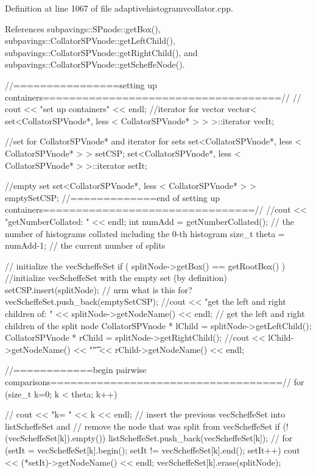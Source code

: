 \-Definition at line 1067 of file adaptivehistogramvcollator.\-cpp.



\-References subpavings\-::\-S\-Pnode\-::get\-Box(), subpavings\-::\-Collator\-S\-P\-Vnode\-::get\-Left\-Child(), subpavings\-::\-Collator\-S\-P\-Vnode\-::get\-Right\-Child(), and subpavings\-::\-Collator\-S\-P\-Vnode\-::get\-Scheffe\-Node().


\begin{DoxyCode}
{
  //================setting up containers====================================//
  // cout << "set up containers" << endl;
  //iterator for vector
   vector< set<CollatorSPVnode*, less < CollatorSPVnode* > > >::iterator vecIt;
    
   //set for CollatorSPVnode* and iterator for sets
   set<CollatorSPVnode*, less < CollatorSPVnode* > > setCSP;
   set<CollatorSPVnode*, less < CollatorSPVnode* > >::iterator setIt;
    
   //empty set
   set<CollatorSPVnode*, less < CollatorSPVnode* > > emptySetCSP;
   //=============end of setting up
       containers================================//
  //cout << "getNumberCollated: " << endl;  
  int numAdd = getNumberCollated(); // the number of histograms collated
       including the 0-th histogram
  size_t theta = numAdd-1; // the current number of splits
  
   // initialize the vecScheffeSet
   if ( splitNode->getBox() == getRootBox() ) { //initialize vecScheffeSet with
       the empty set (by definition)
      setCSP.insert(splitNode); // urm what is this for?
      vecScheffeSet.push_back(emptySetCSP); 
  }
  //cout << "get the left and right children of: " << splitNode->getNodeName()
       << endl;   
   // get the left and right children of the split node
    CollatorSPVnode * lChild = splitNode->getLeftChild(); 
    CollatorSPVnode * rChild = splitNode->getRightChild();
    //cout << lChild->getNodeName() << "\t" << rChild->getNodeName() << endl;
  
    //============begin pairwise
       comparisons===================================//
    for (size_t k=0; k < theta; k++) {  
   //   cout << "k= " << k << endl;      
     // insert the previous vecScheffeSet into listScheffeSet and
    // remove the node that was split from vecScheffeSet 
      if (!(vecScheffeSet[k]).empty()) {
         listScheffeSet.push_back(vecScheffeSet[k]);  
      //  for (setIt = vecScheffeSet[k].begin(); setIt !=
       vecScheffeSet[k].end(); setIt++) { cout << (*setIt)->getNodeName() << endl; }
      vecScheffeSet[k].erase(splitNode);
    }  
   
}}
\end{DoxyCode}
